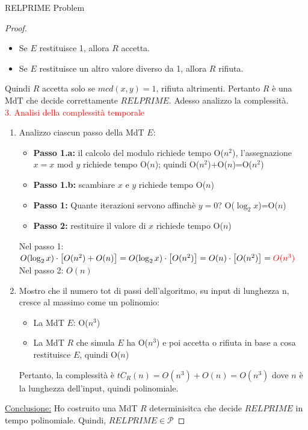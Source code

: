 \documentclass{article}  %
\theoremstyle{definition}
\begin{document}
\begin{theorem}{RELPRIME Problem}
\begin{proof}
\begin{enumerate}
			      \begin{itemize}
				      \item Se $E$ restituisce 1, allora $R$ accetta.
				      \item Se $E$ restituisce un altro valore diverso da 1, allora $R$ rifiuta.
			      \end{itemize}
		\end{enumerate}
		Quindi $R$ accetta solo se $mcd(x,y)=1$, rifiuta altrimenti. Pertanto $R$ è una MdT che decide correttamente $RELPRIME$. Adesso analizzo la complessità. \\
		\textcolor{red}{3. Analisi della complessità temporale}
		\begin{enumerate}
			\item Analizzo ciascun passo della MdT $E$:
			      \begin{itemize}
				      \item \textbf{Passo 1.a:} il calcolo del modulo richiede tempo O($n^2$), l'assegnazione $x=x$ mod $y$ richiede tempo O($n$); quindi O($n^2$)+O($n$)=O($n^2$)
				      \item \textbf{Passo 1.b:} scambiare $x$ e $y$ richiede tempo O($n$)
				      \item \textbf{Passo 1:} Quante iterazioni servono affinchè $y=0$? O($\log_2x$)=O($n$)
				      \item \textbf{Passo 2:} restituire il valore di $x$ richiede tempo O($n$)
			      \end{itemize}
			      Nel passo 1: $O(\log_2x)\cdot\big[O(n^2)+O(n)\big]=O(\log_2x)\cdot\big[O(n^2)\big]=O(n)\cdot\big[O(n^2)\big]=\textcolor{red}{O(n^3)}$ \\
			      Nel passo 2: $O(n)$
			\item Mostro che il numero tot di passi dell'algoritmo, su input di lunghezza n, cresce
			      al massimo come un polinomio:
			      \begin{itemize}
				      \item La MdT $E$: O($n^3$)
				      \item La MdT $R$ che simula $E$ ha O($n^3$) e poi accetta o rifiuta in base a cosa restituisce $E$, quindi O($n$)
			      \end{itemize}
			      Pertanto, la complessità è $tC_R(n)=O(n^3)+O(n)=O(n^3)$ dove $n$ è la lunghezza dell'input, quindi polinomiale.
		\end{enumerate}
		\underline{Conclusione:} Ho costruito una MdT $R$ determinisitca che decide $RELPRIME$ in tempo polinomiale. Quindi, $RELPRIME \in \mathcal{P}$
	\end{proof}
\end{theorem}
\break
\end{document}
